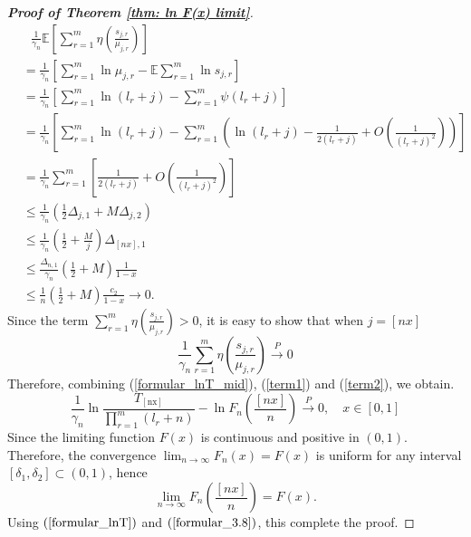 \documentclass[12pt]{article}
\theoremstyle{plain}
\theoremstyle{definition}
\theoremstyle{remark}
\begin{document}
\begin{proof}[\textit{\textbf{Proof of Theorem \ref{thm: ln F(x) limit}}}]
	\begin{equation*}
		\begin{aligned}&\ \ \ \frac{1}{\gamma_{n}} \mathbb{E}\left[\sum_{r=1}^{m} \eta\left(\frac{s_{j, r}}{\mu_{j, r}}\right)\right]\\
			&=\frac{1}{\gamma_{n}} \left[  \sum_{r=1}^{m} \ln \mu_{j, r}-\mathbb{E} \sum_{r=1}^{m} \ln s_{j, r}\right] \\ 
			&=\frac{1}{\gamma_{n}}\left[\sum_{r=1}^{m} \ln \left(l_{r}+j\right)- \sum_{r=1}^{m} \psi\left(l_{r}+j\right)\right] \\ 
			&=\frac{1}{\gamma_{n}}\left[\sum_{r=1}^{m} \ln \left(l_{r}+j\right)-\sum_{r=1}^{m}\left (    \ln \left(l_{r}+j\right)-\frac{1}{2\left(l_{r}+j\right)}+O\left(\frac{1}{\left(l_{r}+j\right)^{2}}\right)\right) \right] \\
			&=\frac{1}{\gamma_{n}}\sum_{r=1}^{m} \left[\frac{1}{2\left(l_{r}+j\right)}+O\left(\frac{1}{\left(l_{r}+j\right)^{2}}\right)\right] \\
			&\leq\frac{1}{\gamma_{n}} \left( \frac{1}{2}\Delta_{j, 1}+M\Delta_{j, 2} \right)\\
			&\leq\frac{1}{\gamma_{n}} (\frac{1}{2}+\frac{M}{j})\Delta_{[nx], 1}\\
			&\leq\frac{\Delta_{n, 1}}{\gamma_{n}} (\frac{1}{2}+M)\frac{1}{1-x}\\
			&\leq\frac{1}{n} (\frac{1}{2}+M)\frac{c_2}{1-x}\to 0.
		\end{aligned}
	\end{equation*}
	Since the term  $\sum_{r=1}^{m} \eta\left(\frac{s_{j, r}}{\mu_{j, r}}\right)>0$, it is easy to show that when $j=[nx]$
	\begin{equation}\label{term2}
	\frac{1}{\gamma_{n}}\sum_{r=1}^{m} \eta\left(\frac{s_{j, r}}{\mu_{j, r}}\right) \stackrel{P}{\rightarrow} 0
	\end{equation}
	Therefore, combining (\ref{formular_lnT_mid}), (\ref{term1}) and (\ref{term2}), we obtain.
	\begin{equation}\label{formular_lnT}
	\frac{1}{\gamma_{n}} \ln \frac{T_{[\mathrm{nx}]}}{\prod_{r=1}^{m}(l_r+n)}-\ln F_n(\frac{[nx]}{n}) \stackrel{P}{\rightarrow} 0, \quad x \in[0,1]
	\end{equation}
	Since the limiting function $F(x)$ is continuous and positive in $(0,1)$. Therefore, the convergence 
	$\lim _{n \rightarrow \infty} F_{n}(x)=F(x)$ is uniform for any interval $\left[\delta_{1}, \delta_{2}\right] \subset(0,1)$, hence 
	\begin{equation}\label{formular_3.8}
	\lim _{n \rightarrow \infty} F_{n}\left(\frac{[n x]}{n}\right)=F(x).
	\end{equation}
	Using $(\ref{formular_lnT})$ and $(\ref{formular_3.8})$, this complete the proof.
\end{proof}
\end{document}
